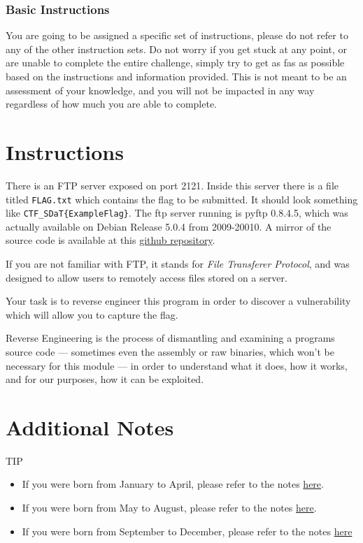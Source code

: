         \subsubsection{Basic Instructions}
            {\parindent0pt\singlespacing
                You are going to be assigned a specific set of instructions, please do not refer to any of the other instruction sets.
                Do not worry if you get stuck at any point, or are unable to complete the entire challenge, simply try to get as fas as possible based on the instructions and information provided. This is not meant to be an assessment of your knowledge, and you will not be impacted in any way regardless of how much you are able to complete. 

                \section*{Instructions}
                    There is an FTP server exposed on port 2121. Inside this server there is a file titled \lstinline`FLAG.txt` which contains the flag to be submitted. It should look something like \lstinline`CTF_SDaT{ExampleFlag}`. The ftp server running is pyftp 0.8.4.5, which was actually available on Debian Release 5.0.4 from 2009-20010. A mirror of the source code is available at this \href{https://github.com/brendonky18/pyftpd-0.8.4.5_mirror}{github repository}.

                    If you are not familiar with FTP, it stands for \textit{File Transferer Protocol}, and was designed to allow users to remotely access files stored on a server. 

                    Your task is to reverse engineer this program in order to discover a vulnerability which will allow you to capture the flag.

                    Reverse Engineering is the process of dismantling and examining a programs source code — sometimes even the assembly or raw binaries, which won't be necessary for this module — in order to understand what it does, how it works, and for our purposes, how it can be exploited.
                \section*{Additional Notes}
                    TIP
                    \begin{itemize}
                        \item If you were born from January to April, please refer to the notes \href{https://github.com/brendonky18/Honors-Thesis.CTFs/blob/main/going-backwards/notes_0.md}{here}.
                        \item If you were born from May to August, please refer to the notes \href{https://github.com/brendonky18/Honors-Thesis.CTFs/blob/main/going-backwards/notes_1.md}{here}.
                        \item If you were born from September to December, please refer to the notes \href{https://github.com/brendonky18/Honors-Thesis.CTFs/blob/main/going-backwards/notes_1.md}{here}
                    \end{itemize}

            }
        \newpage
